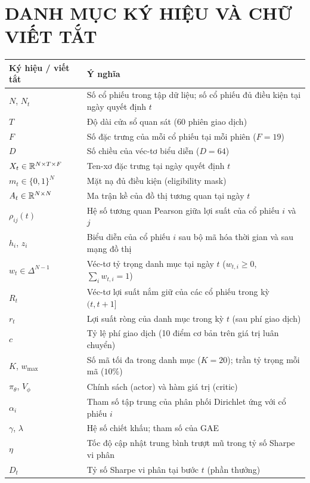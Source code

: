 \chapter*{DANH MỤC KÝ HIỆU VÀ CHỮ VIẾT TẮT}
{\small
\begin{longtable}{@{}p{3.1cm}p{11.6cm}@{}}
\toprule
\textbf{Ký hiệu / viết tắt} & \textbf{Ý nghĩa} \\
\midrule
\endhead
$N$, $N_t$ & Số cổ phiếu trong tập dữ liệu; số cổ phiếu đủ điều kiện tại ngày quyết định $t$ \\
$T$ & Độ dài cửa sổ quan sát (60 phiên giao dịch) \\
$F$ & Số đặc trưng của mỗi cổ phiếu tại mỗi phiên ($F=19$) \\
$D$ & Số chiều của véc-tơ biểu diễn ($D=64$) \\
$X_t \in \mathbb{R}^{N\times T\times F}$ & Ten-xơ đặc trưng tại ngày quyết định $t$ \\
$m_t \in \{0,1\}^{N}$ & Mặt nạ đủ điều kiện (eligibility mask) \\
$A_t \in \mathbb{R}^{N\times N}$ & Ma trận kề của đồ thị tương quan tại ngày $t$ \\
$\rho_{ij}(t)$ & Hệ số tương quan Pearson giữa lợi suất của cổ phiếu $i$ và $j$ \\
$h_i$, $z_i$ & Biểu diễn của cổ phiếu $i$ sau bộ mã hóa thời gian và sau mạng đồ thị \\
$w_t \in \Delta^{N-1}$ & Véc-tơ tỷ trọng danh mục tại ngày $t$ ($w_{t,i}\ge 0$, $\sum_i w_{t,i}=1$) \\
$R_t$ & Véc-tơ lợi suất nắm giữ của các cổ phiếu trong kỳ $(t, t+1]$ \\
$r_t$ & Lợi suất ròng của danh mục trong kỳ $t$ (sau phí giao dịch) \\
$c$ & Tỷ lệ phí giao dịch (10 điểm cơ bản trên giá trị luân chuyển) \\
$K$, $w_{\max}$ & Số mã tối đa trong danh mục ($K=20$); trần tỷ trọng mỗi mã ($10\%$) \\
$\pi_\theta$, $V_\phi$ & Chính sách (actor) và hàm giá trị (critic) \\
$\alpha_i$ & Tham số tập trung của phân phối Dirichlet ứng với cổ phiếu $i$ \\
$\gamma$, $\lambda$ & Hệ số chiết khấu; tham số của GAE \\
$\eta$ & Tốc độ cập nhật trung bình trượt mũ trong tỷ số Sharpe vi phân \\
$D_t$ & Tỷ số Sharpe vi phân tại bước $t$ (phần thưởng) \\

\end{longtable}}
